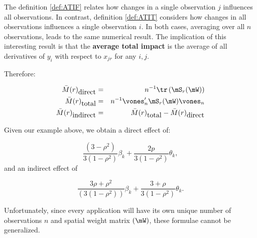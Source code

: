 \documentclass[english,12pt]{book}\usepackage[]{graphicx}\usepackage[]{xcolor}
\begin{document}
The definition \ref{def:ATIF} relates how changes in a single observation $j$ influences all observations. In contrast, definition \ref{def:ATIT} considers how changes in all observations influences a single observation $i$. In both cases, averaging over all $n$ observations, leads to the same numerical result. The implication of this interesting result is that the \textbf{average total impact} is the average of all derivatives of $y_i$ with respect to $x_{jr}$ for any $i, j$. 

Therefore:

\begin{eqnarray}
\bar{M}(r)_{\mbox{direct}} & = & n^{-1}\tr\left(\mS_r(\mW)\right) \\
\bar{M}(r)_{\mbox{total}} & = & n^{-1}\vones_n'\mS_r(\mW)\vones_n \\
\bar{M}(r)_{\mbox{indirect}} & = & \bar{M}(r)_{\mbox{total}} - \bar{M}(r)_{\mbox{direct}}
\end{eqnarray}	


Given our example above, we obtain a direct effect of:

\begin{equation*}
  \frac{(3- \rho^2)}{3(1 - \rho^2)}\beta_k + \frac{2p}{3(1-\rho^2)}\theta_k,
\end{equation*}
%
and an indirect effect of

\begin{equation*}
  \frac{3\rho + \rho^2}{(3(1-\rho^2))}\beta_k + \frac{3 + \rho}{3(1- \rho^2)}\theta_k.
\end{equation*}

Unfortunately, since every application will have its own unique number of observations $n$ and spatial weight matrix $(\mW)$, these formulae cannot be generalized. 
\end{document}
